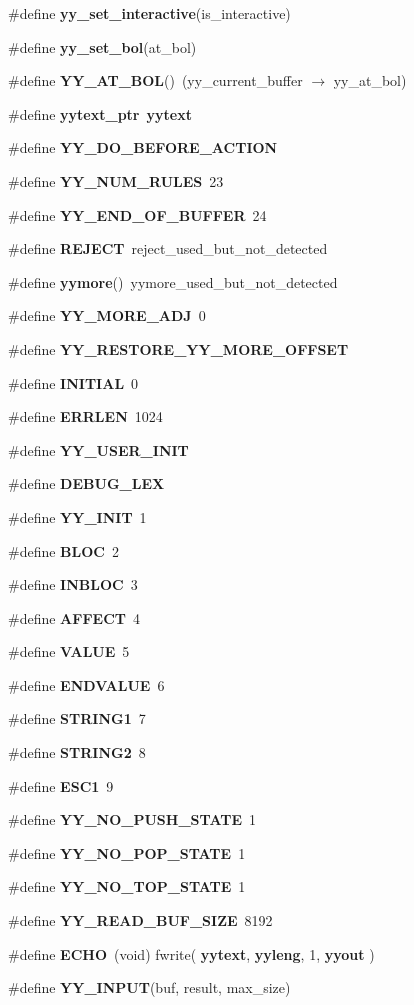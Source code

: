 \begin{CompactItemize}
\item 
\#define {\bf yy\_\-set\_\-interactive}(is\_\-interactive)
\item 
\#define {\bf yy\_\-set\_\-bol}(at\_\-bol)
\item 
\#define {\bf YY\_\-AT\_\-BOL}()\ (yy\_\-current\_\-buffer $\rightarrow$ yy\_\-at\_\-bol)
\item 
\#define {\bf yytext\_\-ptr}\ {\bf yytext}
\item 
\#define {\bf YY\_\-DO\_\-BEFORE\_\-ACTION}
\item 
\#define {\bf YY\_\-NUM\_\-RULES}\ 23
\item 
\#define {\bf YY\_\-END\_\-OF\_\-BUFFER}\ 24
\item 
\#define {\bf REJECT}\ reject\_\-used\_\-but\_\-not\_\-detected
\item 
\#define {\bf yymore}()\ yymore\_\-used\_\-but\_\-not\_\-detected
\item 
\#define {\bf YY\_\-MORE\_\-ADJ}\ 0
\item 
\#define {\bf YY\_\-RESTORE\_\-YY\_\-MORE\_\-OFFSET}
\item 
\#define {\bf INITIAL}\ 0
\item 
\#define {\bf ERRLEN}\ 1024
\item 
\#define {\bf YY\_\-USER\_\-INIT}
\item 
\#define {\bf DEBUG\_\-LEX}
\item 
\#define {\bf YY\_\-INIT}\ 1
\item 
\#define {\bf BLOC}\ 2
\item 
\#define {\bf INBLOC}\ 3
\item 
\#define {\bf AFFECT}\ 4
\item 
\#define {\bf VALUE}\ 5
\item 
\#define {\bf ENDVALUE}\ 6
\item 
\#define {\bf STRING1}\ 7
\item 
\#define {\bf STRING2}\ 8
\item 
\#define {\bf ESC1}\ 9
\item 
\#define {\bf YY\_\-NO\_\-PUSH\_\-STATE}\ 1
\item 
\#define {\bf YY\_\-NO\_\-POP\_\-STATE}\ 1
\item 
\#define {\bf YY\_\-NO\_\-TOP\_\-STATE}\ 1
\item 
\#define {\bf YY\_\-READ\_\-BUF\_\-SIZE}\ 8192
\item 
\#define {\bf ECHO}\ (void) fwrite( {\bf yytext}, {\bf yyleng}, 1, {\bf yyout} )
\item 
\#define {\bf YY\_\-INPUT}(buf, result, max\_\-size)

\end{CompactItemize}
